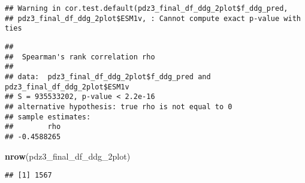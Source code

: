\documentclass[
]{article}
\newenvironment{Shaded}{\begin{snugshade}}{\end{snugshade}}
\newcommand{\FunctionTok}[1]{\textcolor[rgb]{0.13,0.29,0.53}{\textbf{#1}}}
\newcommand{\NormalTok}[1]{#1}
\begin{document}
\begin{verbatim}
## Warning in cor.test.default(pdz3_final_df_ddg_2plot$f_ddg_pred,
## pdz3_final_df_ddg_2plot$ESM1v, : Cannot compute exact p-value with ties
\end{verbatim}

\begin{verbatim}
## 
##  Spearman's rank correlation rho
## 
## data:  pdz3_final_df_ddg_2plot$f_ddg_pred and pdz3_final_df_ddg_2plot$ESM1v
## S = 935533202, p-value < 2.2e-16
## alternative hypothesis: true rho is not equal to 0
## sample estimates:
##        rho 
## -0.4588265
\end{verbatim}

\begin{Shaded}
\begin{Highlighting}[]
\FunctionTok{nrow}\NormalTok{(pdz3\_final\_df\_ddg\_2plot)}
\end{Highlighting}
\end{Shaded}

\begin{verbatim}
## [1] 1567
\end{verbatim}
\end{document}
